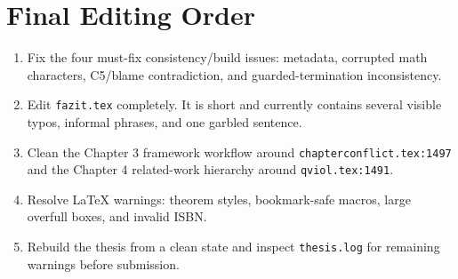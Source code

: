 \documentclass[11pt,a4paper]{article}
\newcommand{\loc}[1]{\texttt{#1}}
\begin{document}
\section*{Final Editing Order}

\begin{enumerate}
  \item Fix the four must-fix consistency/build issues: metadata, corrupted math
  characters, C5/blame contradiction, and guarded-termination inconsistency.
  \item Edit \loc{fazit.tex} completely. It is short and currently contains several
  visible typos, informal phrases, and one garbled sentence.
  \item Clean the Chapter 3 framework workflow around \loc{chapterconflict.tex:1497}
  and the Chapter 4 related-work hierarchy around \loc{qviol.tex:1491}.
  \item Resolve LaTeX warnings: theorem styles, bookmark-safe macros, large overfull
  boxes, and invalid ISBN.
  \item Rebuild the thesis from a clean state and inspect \loc{thesis.log} for
  remaining warnings before submission.
\end{enumerate}
\end{document}

